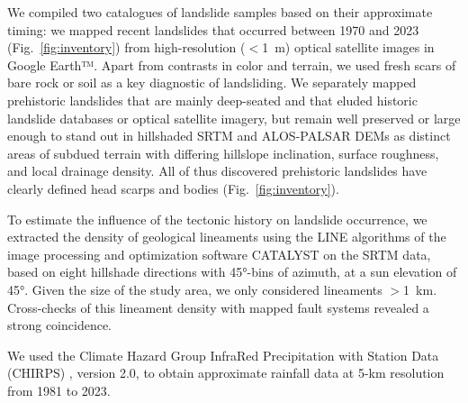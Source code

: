 \documentclass[draft]{agujournal2019}
\begin{document}
\par We compiled two catalogues of landslide samples based on their approximate timing: we mapped recent landslides that occurred between 1970 and 2023 (Fig.~\ref{fig:inventory}) from high-resolution ($<$1~m) optical satellite images in Google Earth™. Apart from contrasts in color and terrain, we used fresh scars of bare rock or soil as a key diagnostic of landsliding. We separately mapped prehistoric landslides that are mainly deep-seated and that eluded historic landslide databases or optical satellite imagery, but remain well preserved or large enough to stand out in hillshaded SRTM and ALOS-PALSAR DEMs as distinct areas of subdued terrain with differing hillslope inclination, surface roughness, and local drainage density. All of thus discovered prehistoric landslides have clearly defined head scarps and bodies (Fig.~\ref{fig:inventory}).

\par To estimate the influence of the tectonic history on landslide occurrence, we extracted the density of geological lineaments using the LINE algorithms of the image processing and optimization software CATALYST on the SRTM data, based on eight hillshade directions with 45°-bins of azimuth, at a sun elevation of 45°. Given the size of the study area, we only considered lineaments $>$1~km. Cross-checks of this lineament density with mapped fault systems revealed a strong coincidence.

\par We used the Climate Hazard Group InfraRed Precipitation with Station Data (CHIRPS) \cite{funk2015}, version 2.0, to obtain approximate rainfall data at 5-km resolution from 1981 to 2023.
\end{document}
